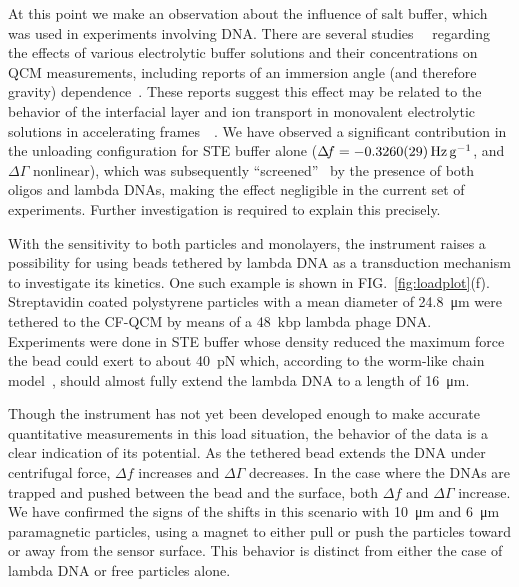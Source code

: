 \documentclass[floatfix,superscriptaddress,a4paper,twocolumn]{revtex4-1}
\newcommand{\Figure}[1]{FIG.~\ref{#1}}
\newcommand{\df}{\Delta\!f}
\newcommand{\dg}{\Delta\Gamma}
\begin{document}
At this point we make an observation about the influence of salt buffer,
which was used in experiments involving DNA.  There are several
studies~\cite{encarnaccao2007influence}~\cite{lin1995role} regarding the
effects of various electrolytic buffer solutions and their concentrations
on QCM measurements, including reports of an immersion angle (and therefore
gravity) dependence~\cite{yoshimoto2006characteristics}.  These reports
suggest this effect may be related to the behavior of the interfacial layer
and ion transport in monovalent electrolytic solutions in accelerating
frames~\cite{tolman1911electromotive}~\cite{des1893unpolarisirbare}.  We
have observed a significant contribution in the unloading configuration for
STE buffer alone ($\df=\SI{-0.326+-0.0029}{\hertz\per\g}$, and $\dg$
nonlinear), which was subsequently ``screened''~\cite{zhang2002insulating}
by the presence of both oligos and lambda DNAs, making the effect
negligible in the current set of experiments.  Further investigation is
required to explain this precisely.

With the sensitivity to both particles and monolayers, the instrument
raises a possibility for using beads tethered by lambda DNA as a
transduction mechanism to investigate its kinetics.  One such example is
shown in \Figure{fig:loadplot}(f).  Streptavidin coated polystyrene
particles with a mean diameter of \SI{24.8}{\micro\meter} were tethered to
the CF-QCM by means of a \SI{48}{kbp} lambda phage DNA.  Experiments were
done in STE buffer whose density reduced the maximum force the bead could
exert to about \SI{40}{\pico\newton} which, according to the worm-like
chain model~\cite{marko1995stretching}, should almost fully extend the
lambda DNA to a length of \SI{16}{\micro\meter}.

Though the instrument has not yet been developed enough to make accurate
quantitative measurements in this load situation, the behavior of the data
is a clear indication of its potential.  As the tethered bead extends the
DNA under centrifugal force, $\df$ increases and $\dg$ decreases.  In the
case where the DNAs are trapped and pushed between the bead and the
surface, both $\df$ and $\dg$ increase.  We have confirmed the signs of the
shifts in this scenario with \SI{10}{\micro\meter} and \SI{6}{\micro\meter}
paramagnetic particles, using a magnet to either pull or push the
particles toward or away from the sensor surface.  This behavior is
distinct from either the case of lambda DNA or free particles alone.
\end{document}
